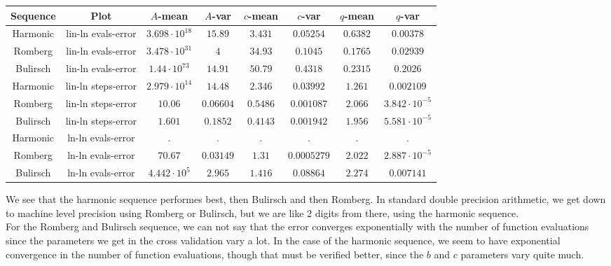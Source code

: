 \begin{table}[H]
    \centering
    \small
    \begin{tabular}{c|c||c|c|c|c|c	|c}
Sequence & Plot & \(A\)-mean & \(A\)-var & \(c\)-mean & \(c\)-var & \(q\)-mean & \(q\)-var\\\hline
Harmonic & lin-ln evals-error & \(3.698\cdot 10^{18}\) & \(15.89\) & \(3.431\) & \(0.05254\) & \(0.6382\) & \(0.00378\) \\
Romberg & lin-ln evals-error & \(3.478\cdot 10^{31}\) & \(4\) & \(34.93\) & \(0.1045\) & \(0.1765\) & \(0.02939\) \\
Bulirsch & lin-ln evals-error & \(1.44\cdot 10^{73}\) & \(14.91\) & \(50.79\) & \(0.4318\) & \(0.2315\) & \(0.2026\) \\
Harmonic & lin-ln steps-error & \(2.979\cdot 10^{14}\) & \(14.48\) & \(2.346\) & \(0.03992\) & \(1.261\) & \(0.002109\) \\
Romberg & lin-ln steps-error & \(10.06\) & \(0.06604\) & \(0.5486\) & \(0.001087\) & \(2.066\) & \(3.842\cdot 10^{-5}\) \\
Bulirsch & lin-ln steps-error & \(1.601\) & \(0.1852\) & \(0.4143\) & \(0.001942\) & \(1.956\) & \(5.581\cdot 10^{-5}\) \\
Harmonic & ln-ln evals-error & . & . & . & . & . & . \\
Romberg & ln-ln evals-error & \(70.67\) & \(0.03149\) & \(1.31\) & \(0.0005279\) & \(2.022\) & \(2.887\cdot 10^{-5}\) \\
Bulirsch & ln-ln evals-error & \(4.442\cdot 10^5\) & \(2.965\) & \(1.416\) & \(0.08864\) & \(2.274\) & \(0.007141\) \\
    \end{tabular}
    \label{tab:my_label}
\end{table}

We see that the harmonic sequence performes best, then Bulirsch and then Romberg. In standard double precision arithmetic, we get down to machine level precision using Romberg or Bulirsch, but we are like \(2\) digits from there, using the harmonic sequence.\\

For the Romberg and Bulirsch sequence, we can not say that the error converges exponentially with the number of function evaluations since the parameters we get in the cross validation vary a lot. In the case of the harmonic sequence, we seem to have exponential convergence in the number of function evaluations, though that must be verified better, since the \(b\) and \(c\) parameters vary quite much.\\

